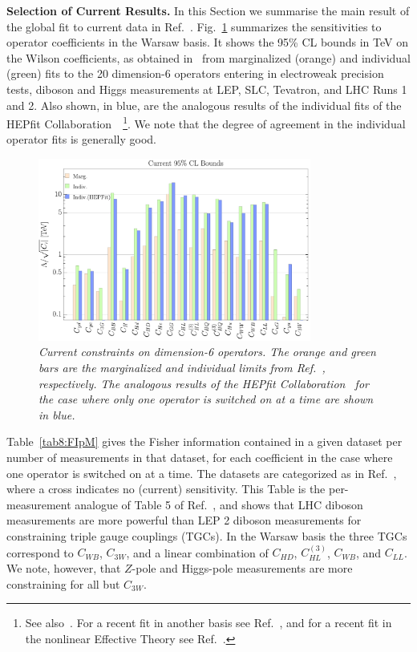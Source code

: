 \documentclass[../report.tex]{subfiles}
\begin{document}
\vspace{5mm}
\noindent
{\bf Selection of Current Results.} 
\label{sec8:curr}
In this Section we summarise the main result of the global fit to current data in Ref.~\cite{Ellis:2018gqa}. Fig.~\ref{fig8:HEPfitvsEMSY} summarizes the sensitivities to operator coefficients in the Warsaw basis.
It shows the 95\% CL bounds in TeV on the Wilson coefficients, as obtained in~\cite{Ellis:2018gqa} from marginalized (orange) and individual (green) fits to the 20 dimension-6 operators 
entering in electroweak precision tests, diboson and Higgs measurements at LEP, SLC, Tevatron, and LHC Runs 1 and 2.
Also shown, in blue, are the analogous results of the individual fits of the HEPfit Collaboration~\cite{Ciuchini:2013pca, deBlas:2016ojx}~\footnote{See 
also~\cite{luca:talk, otto:talk}. For a recent fit in another basis see Ref.~\cite{Alves:2018nof}, and
for a recent fit in the nonlinear Effective Theory see Ref.~\cite{deBlas:2018tjm}.}. 
We note that the degree of agreement in the individual operator fits is generally good. 


\begin{figure}
  \centering
\includegraphics[width=0.8\textwidth]{section8/plots/barcompcnorm.pdf}
\vspace{-0.2cm}
 \caption{\it Current constraints on dimension-6 operators. The orange and green bars are the marginalized and individual limits from Ref.~\cite{Ellis:2018gqa}, respectively. 
 The analogous results of the HEPfit Collaboration~\cite{Ciuchini:2013pca, deBlas:2016ojx} for the case where only one operator is switched on at a time are shown in blue.}
   \label{fig8:HEPfitvsEMSY}
\end{figure} 

Table~\ref{tab8:FIpM} gives the Fisher information contained in a given dataset per number of measurements in that dataset,
for each coefficient in the case where one operator is switched on at a time.
The datasets are categorized as in Ref.~\cite{Ellis:2018gqa}, where a
cross indicates no (current) sensitivity.
This Table is the per-measurement analogue of Table 5 of Ref.~\cite{Ellis:2018gqa}, and
shows that LHC diboson measurements are more powerful than LEP 2 diboson measurements for constraining triple gauge couplings (TGCs).
In the Warsaw basis the three TGCs correspond to $C_{WB}$, $C_{3W}$, and a linear combination of $C_{HD}$, $C_{HL}^{(3)}$, $C_{WB}$, and $C_{LL}$.
We note, however, that $Z$-pole and Higgs-pole measurements are more constraining for all but $C_{3W}$. 
\end{document}
